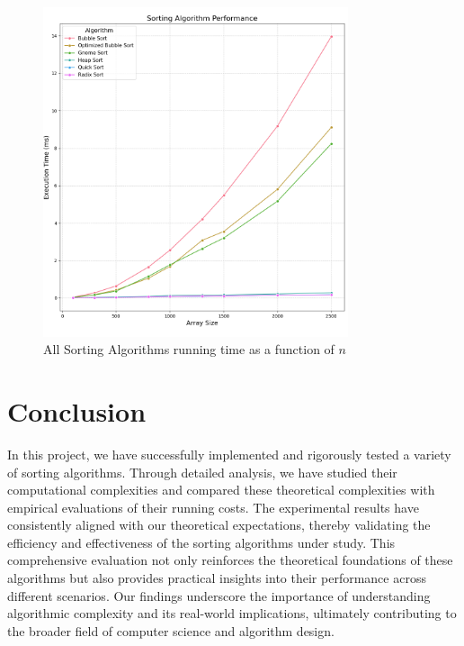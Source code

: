 \documentclass{article}
\begin{document}
\begin{figure}[H]
	\includegraphics[width=0.8\textwidth]{images/all_sorts.png}
	\caption{All Sorting Algorithms running time as a function of $n$}
\end{figure}

\section{Conclusion}
In this project, we have successfully implemented and rigorously tested a variety of sorting algorithms. Through detailed analysis, we have studied their computational complexities and compared these theoretical complexities with empirical evaluations of their running costs. The experimental results have consistently aligned with our theoretical expectations, thereby validating the efficiency and effectiveness of the sorting algorithms under study. This comprehensive evaluation not only reinforces the theoretical foundations of these algorithms but also provides practical insights into their performance across different scenarios. Our findings underscore the importance of understanding algorithmic complexity and its real-world implications, ultimately contributing to the broader field of computer science and algorithm design.
\end{document}

